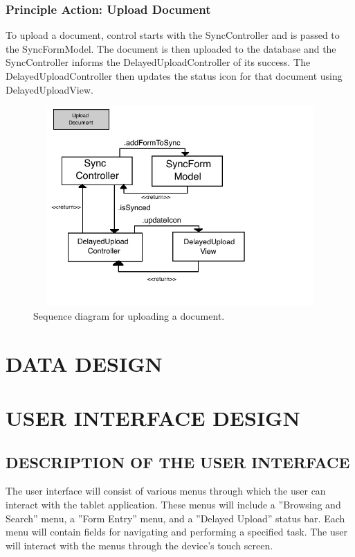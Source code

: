 \documentclass[twoside,letterpaper]{article}
\begin{document}
{\subsubsection{Principle Action: Upload Document}
To upload a document, control starts with the SyncController and is passed to the SyncFormModel. The document is then uploaded to the database and the SyncController informs the DelayedUploadController of its success. The DelayedUploadController then updates the status icon for that document using DelayedUploadView.
\begin{figure}[H]
\centering
\includegraphics[width=5in,height=3in]{Upload.jpg}
\caption{Sequence diagram for uploading a document.}
\end{figure}


\clearpage\section[DATA DESIGN]{\rmfamily\bfseries\color{black}
DATA DESIGN}

\clearpage\section[USER INTERFACE DESIGN]{\rmfamily\bfseries\color{black}
USER INTERFACE DESIGN}

\subsection[DESCRIPTION OF THE USER INTERFACE]{\rmfamily\bfseries\color{black}
DESCRIPTION OF THE USER INTERFACE}
{\rmfamily\color{black}
The user interface will consist of various menus through which the user can interact with the tablet application. These menus will include a ''Browsing and Search'' menu, a ''Form Entry'' menu, and a ''Delayed Upload'' status bar. Each menu will contain fields for navigating and performing a specified task. The user will interact with the menus through the device's touch screen.
\newline

}}
\end{document}
